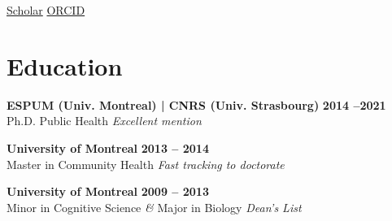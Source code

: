 \documentclass{resume}
\begin{document}
\begin{center}
	\contact
  {\href{https://scholar.google.com/citations?user=hD2L0ScAAAAJ}{Scholar}}
	{\href{https://orcid.org/0000-0003-4559-2110}{ORCID}}
\end{center}

\section{Education} 
\begin{content}
    {\bf ESPUM (Univ. Montreal) | CNRS (Univ. Strasbourg)}  \hfill {\bf 2014 --2021} \\
    {Ph.D. Public Health} \hfill
    {\em Excellent mention}

    {\bf University of Montreal} \hfill {\bf 2013 -- 2014} \\ 
	{Master in Community Health} \hfill 
	{\em Fast tracking to doctorate}

    {\bf University of Montreal} \hfill {\bf 2009 -- 2013} \\ 
    {Minor in Cognitive Science {\em\&} Major in Biology} \hfill 
    {\em Dean's List}
    
\sectionlineskip
\end{content}

\end{document}
